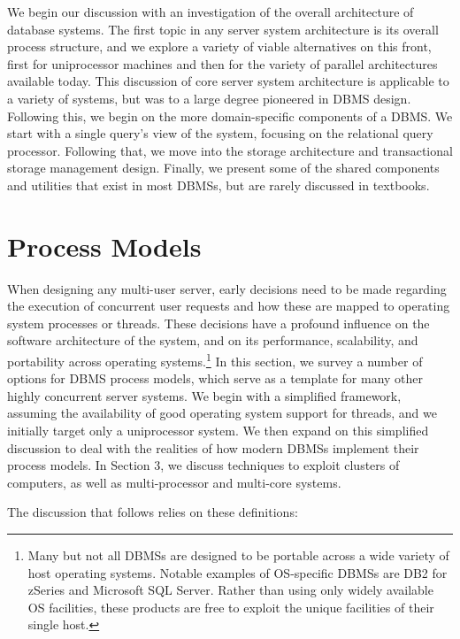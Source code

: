\documentclass[b5paper,11pt,twoside,openright]{book}
\begin{document}
We begin our discussion with an investigation of the overall
architecture of database systems. The first topic in any server system
architecture is its overall process structure, and we explore a variety
of viable alternatives on this front, first for uniprocessor machines
and then for the variety of parallel architectures available today. This
discussion of core server system architecture is applicable to a variety
of systems, but was to a large degree pioneered in DBMS design.
Following this, we begin on the more domain-specific components of a
DBMS. We start with a single query's view of the system, focusing on the
relational query processor. Following that, we move into the storage
architecture and transactional storage management design. Finally, we
present some of the shared components and utilities that exist in most
DBMSs, but are rarely discussed in textbooks.

\hypertarget{process-models}{%
\chapter{Process Models}\label{process-models}}

When designing any multi-user server, early decisions need to be made
regarding the execution of concurrent user requests and how these are
mapped to operating system processes or threads. These decisions have a
profound influence on the software architecture of the system, and on
its performance, scalability, and portability across operating
systems.\footnote{Many but not all DBMSs are designed to be portable
across a wide variety of host operating systems. Notable examples of
OS-specific DBMSs are DB2 for zSeries and Microsoft SQL Server. Rather
than using only widely available OS facilities, these products are free
to exploit the unique facilities of their single host.}
In this section, we survey a number of
options for DBMS process models, which serve as a template for many
other highly concurrent server systems. We begin with a simplified
framework, assuming the availability of good operating system support
for threads, and we initially target only a uniprocessor system. We then
expand on this simplified discussion to deal with the realities of how
modern DBMSs implement their process models. In Section 3, we discuss
techniques to exploit clusters of computers, as well as multi-processor
and multi-core systems.

The discussion that follows relies on these definitions:
\end{document}
